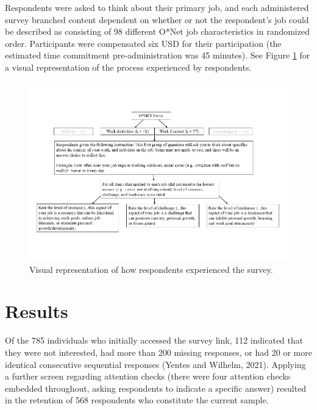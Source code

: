 \documentclass[
  man]{apa7}
\begin{document}
Respondents were asked to think about their primary job, and each administered survey branched content dependent on whether or not the respondent's job could be described as consisting of 98 different O*Net job characteristics in randomized order. Participants were compensated six USD for their participation (the estimated time commitment pre-administration was 45 minutes). See Figure \ref{fig:onetviz} for a visual representation of the process experienced by respondents.

\begin{figure}
\centering
\includegraphics{Submission_files/figure-latex/onetviz-1.pdf}
\caption{\label{fig:onetviz}Visual representation of how respondents experienced the survey.}
\end{figure}

\hypertarget{results}{%
\section{Results}\label{results}}

Of the 785 individuals who initially accessed the survey link, 112 indicated that they were not interested, had more than 200 missing responses, or had 20 or more identical consecutive sequential responses (Yentes and Wilhelm, 2021). Applying a further screen regarding attention checks (there were four attention checks embedded throughout, asking respondents to indicate a specific answer) resulted in the retention of 568 respondents who constitute the current sample.
\end{document}
